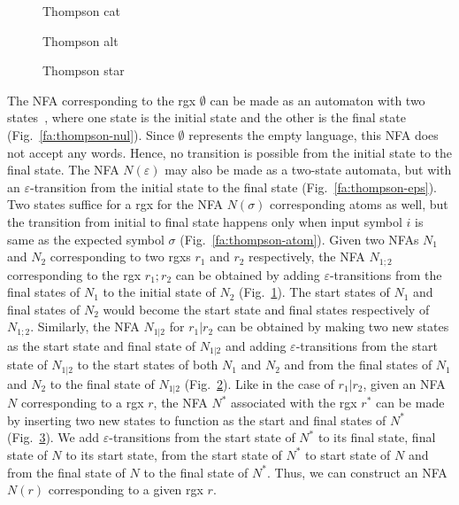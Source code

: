 \begin{figure}
  \centering
  
  \caption{Thompson cat}
  \label{fa:thompson-cat}
\end{figure}


\begin{figure}
  \centering
  
  \caption{Thompson alt}
  \label{fa:thompson-alt}
\end{figure}

\begin{figure}
  \centering
  
  \caption{Thompson star}
  \label{fa:thompson-star}
\end{figure}


The \gls{NFA} corresponding to the \gls{rgx} $\emptyset$ can be made
as an automaton with two states~\cite{hopcroft2001book}, where one
state is the initial state and the other is the final state
(Fig.~\ref{fa:thompson-nul}).
Since $\emptyset$ represents the empty language, this \gls{NFA} does
not accept any words.
Hence, no transition is possible from the initial state to the final
state.
The \gls{NFA} $N(\varepsilon)$ may also be made as a two-state
automata, but with an $\varepsilon$-transition from the initial state
to the final state (Fig.~\ref{fa:thompson-eps}).
Two states suffice for a \gls{rgx} for the \gls{NFA} $N(\sigma)$
corresponding atoms as well, but the transition from initial to final
state happens only when input symbol $i$ is same as the expected
symbol $\sigma$ (Fig.~\ref{fa:thompson-atom}).
%
Given two \glspl{NFA} $N_1$ and $N_2$ corresponding to two \glspl{rgx}
$r_1$ and $r_2$ respectively, the \gls{NFA} $N_{1;2}$ corresponding to
the \gls{rgx} $r_1;r_2$ can be obtained by adding
$\varepsilon$-transitions from the final states of $N_1$ to the
initial state of $N_2$ (Fig.~\ref{fa:thompson-cat}).
The start states of $N_1$ and final states of $N_2$ would become the
start state and final states respectively of $N_{1;2}$.
Similarly, the \gls{NFA} $N_{1|2}$ for $r_1|r_2$ can be obtained by
making two new states as the start state and final state of $N_{1|2}$
and adding $\varepsilon$-transitions from the start state of $N_{1|2}$
to the start states of both $N_1$ and $N_2$ and from the final states
of $N_1$ and $N_2$ to the final state of $N_{1|2}$
(Fig.~\ref{fa:thompson-alt}).
Like in the case of $r_1|r_2$, given an \gls{NFA} $N$ corresponding to
a \gls{rgx} $r$, the \gls{NFA} $N^*$ associated with the \gls{rgx}
$r^*$ can be made by inserting two new states to function as the start
and final states of $N^*$
(Fig.~\ref{fa:thompson-star}).
We add $\varepsilon$-transitions from the start state of $N^*$ to its
final state, final state of $N$ to its start state, from the start
state of $N^*$ to start state of $N$ and from the final state of $N$
to the final state of $N^*$.
Thus, we can construct an \gls{NFA} $N(r)$ corresponding to a given
\gls{rgx} $r$.

